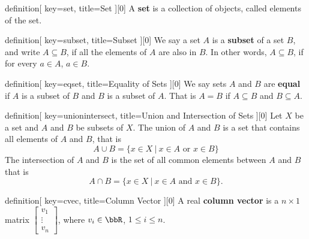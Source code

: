 


\begin{SaveConcept}{definition}[
		key=set,
		title={Set}
	][0]
	A \textbf{set} is a collection of objects, called elements of the set.
\end{SaveConcept}


\begin{SaveConcept}{definition}[
		key=subset,
		title={Subset}
	][0]
	We say a set $A$  is a \textbf{subset} of a set $B$, and write $A\subseteq B$,  if all the elements of $A$ are also in $B$. In other words, $A\subseteq B$, if for every $a\in A$, $a\in B$. 
\end{SaveConcept}


\begin{SaveConcept}{definition}[
		key=eqset,
		title={Equality of Sets}
	][0]
	We say sets $A$ and $B$ are\textbf{ equal} if $A$ is a subset of $B$ and $B$ is a subset of $A$. That is $A=B$ if $A\subseteq B$ and $B\subseteq A$.
\end{SaveConcept}


\begin{SaveConcept}{definition}[
		key=unionintersect,
		title={Union and Intersection of Sets}
	][0]
	Let $X$ be a set and $A$ and $B$ be subsets of $X$. The union of $A$ and $B$ is a set that contains all elements of $A$ and $B$, that is
        $$
        A\cup B=\{x\in X\:|\: x\in A \text{ or } x\in B\}
        $$
        The intersection of $A$ and $B$ is the set of all common elements between $A$ and $B$ that is
        $$
        A\cap B=\{x\in X\:|\: x\in A \text{ and } x\in B\}.
        $$
\end{SaveConcept}


\begin{SaveConcept}{definition}[
		key=cvec,
		title={Column Vector}
	][0]
	A real \textbf{column vector} is a $n\times 1$ matrix $\begin{bmatrix} v_1\\\vdots\\v_n \end{bmatrix}$, where $ v_i\in \bbR$, $1\leq i\leq n$.  
\end{SaveConcept}


